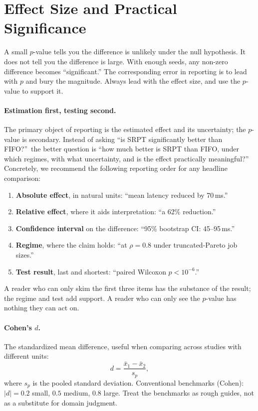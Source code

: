 \documentclass[11pt]{article}
\begin{document}
\section{Effect Size and Practical Significance}
\label{sec:effect-size}

A small $p$-value tells you the difference is unlikely under the null hypothesis. It does not tell you the difference is large. With enough seeds, any non-zero difference becomes ``significant.'' The corresponding error in reporting is to lead with $p$ and bury the magnitude. Always lead with the effect size, and use the $p$-value to support it.

\paragraph{Estimation first, testing second.} The primary object of reporting is the estimated effect and its uncertainty; the $p$-value is secondary. Instead of asking ``is SRPT significantly better than FIFO?''~the better question is ``how much better is SRPT than FIFO, under which regimes, with what uncertainty, and is the effect practically meaningful?'' Concretely, we recommend the following reporting order for any headline comparison:

\begin{enumerate}[leftmargin=*, itemsep=1pt]
    \item \textbf{Absolute effect}, in natural units: ``mean latency reduced by 70\,ms.''
    \item \textbf{Relative effect}, where it aids interpretation: ``a 62\% reduction.''
    \item \textbf{Confidence interval} on the difference: ``95\% bootstrap CI: 45--95\,ms.''
    \item \textbf{Regime}, where the claim holds: ``at $\rho=0.8$ under truncated-Pareto job sizes.''
    \item \textbf{Test result}, last and shortest: ``paired Wilcoxon $p < 10^{-6}$.''
\end{enumerate}

A reader who can only skim the first three items has the substance of the result; the regime and test add support. A reader who can only see the $p$-value has nothing they can act on.

\paragraph{Cohen's $d$.} The standardized mean difference, useful when comparing across studies with different units:
\begin{equation}
d = \frac{\bar{x}_1 - \bar{x}_2}{s_p},
\end{equation}
where $s_p$ is the pooled standard deviation. Conventional benchmarks (Cohen): $|d| = 0.2$ small, $0.5$ medium, $0.8$ large. Treat the benchmarks as rough guides, not as a substitute for domain judgment.
\end{document}
